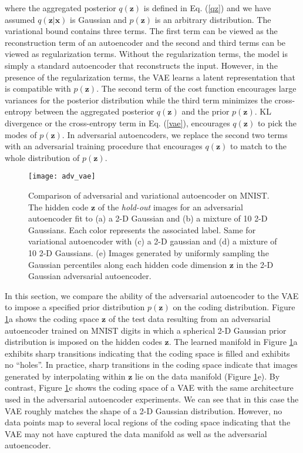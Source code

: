 \documentclass{article}
\begin{document}
where the aggregated posterior $q(\mathbf{z})$ is defined in Eq. (\ref{qz}) and we have assumed $q(\mathbf{z}|\mathbf{x})$ is Gaussian and $p(\mathbf{z})$ is an arbitrary distribution.
The variational bound contains three terms.
The first term can be viewed as the reconstruction term of an autoencoder and the second and third terms can be viewed as regularization terms.
Without the regularization terms, the model is simply a standard autoencoder that reconstructs the input.
However, in the presence of the regularization terms, the VAE learns a latent representation that is compatible with $p(\mathbf{z})$.
The second term of the cost function encourages large variances for the posterior distribution while the third term minimizes the cross-entropy between the aggregated posterior $q(\mathbf{z})$ and the prior $p(\mathbf{z})$. 
KL divergence or the cross-entropy term in Eq. (\ref{vae}), encourages $q(\mathbf{z})$ to pick the modes of $p(\mathbf{z})$. In adversarial autoencoders, we replace the second two terms with an adversarial training procedure that encourages $q(\mathbf{z})$ to match to the whole distribution of $p(\mathbf{z})$.




\begin{figure}[t]
\centering\texttt{[image: adv\_vae]}
\caption{\label{fig_mnist}Comparison of adversarial and variational autoencoder on MNIST. The hidden code $\mathbf{z}$ of the \emph{hold-out} images for an adversarial autoencoder fit to (a) a 2-D Gaussian and (b) a mixture of 10 2-D Gaussians. Each color represents the associated label. Same for variational autoencoder with (c) a 2-D gaussian and (d) a mixture of 10 2-D Gaussians. (e) Images generated by uniformly sampling the Gaussian percentiles along each hidden code dimension $\mathbf{z}$ in the 2-D Gaussian adversarial autoencoder.}
\end{figure}

In this section, we compare the ability of the adversarial autoencoder to the VAE to impose a specified prior distribution $p(\mathbf{z})$ on the coding distribution.
Figure \ref{fig_mnist}a shows the coding space $\mathbf{z}$ of the test data resulting from an adversarial autoencoder trained on MNIST digits in which a
spherical 2-D Gaussian prior distribution is imposed on the hidden codes $\mathbf{z}$.
The learned manifold in Figure \ref{fig_mnist}a exhibits sharp transitions indicating that the coding space is filled and exhibits no ``holes''.
In practice, sharp transitions in the coding space indicate that images generated by interpolating within $\mathbf{z}$ lie on the data manifold (Figure \ref{fig_mnist}e).
By contrast, Figure \ref{fig_mnist}c shows the coding space of a VAE with the same architecture used in the adversarial autoencoder experiments.
We can see that in this case the VAE roughly matches the shape of a 2-D Gaussian distribution.
However, no data points map to several local regions of the coding space indicating that the VAE may not have captured the data manifold
as well as the adversarial autoencoder.
\end{document}
